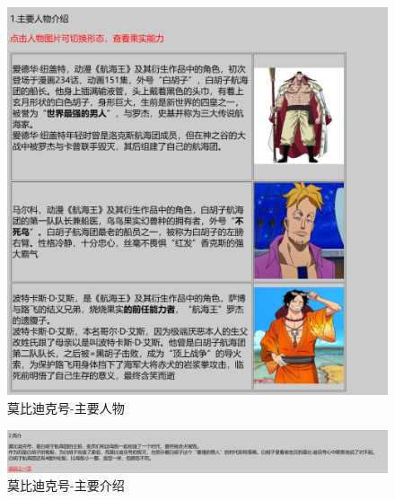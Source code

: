 \documentclass[supercite]{Experimental_Report}
\theoremstyle{definition}
\begin{document}
\begin{figure}[htp]
	\begin{center}
		\includegraphics[scale=0.40]{images/fen3.1.png}
		\caption{莫比迪克号-主要人物}
		\label{fig3-5}
	\end{center}
\end{figure}
\begin{figure}[htp]
	\begin{center}
		\includegraphics[scale=0.50]{images/fen3.2.png}
		\caption{莫比迪克号-主要介绍}
		\label{fig3-6}
	\end{center}
\end{figure}
\end{document}

